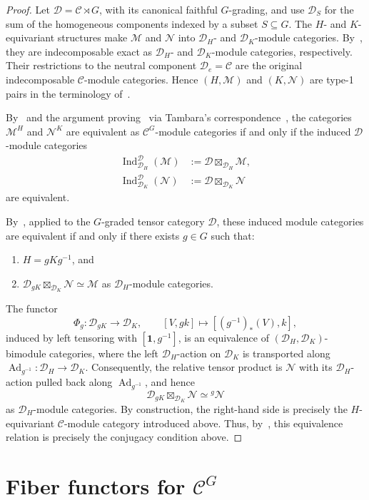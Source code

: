 \documentclass[12pt]{amsart}
\theoremstyle{plain}
\theoremstyle{definition} %
\theoremstyle{remark} %
\newcommand{\cC}{\mathcal{C}}
\newcommand{\cD}{\mathcal{D}}
\newcommand{\cM}{\mathcal{M}}
\newcommand{\cN}{\mathcal{N}}
\DeclareMathOperator{\Ind}{Ind}
\newcommand{\Ad}{\operatorname{Ad}}
\begin{document}
\begin{proof}
Let $\cD=\cC\rtimes G$, with its canonical faithful $G$-grading, and use $\cD_S$ for the sum of the homogeneous components indexed by a subset $S\subseteq G$. The $H$- and $K$-equivariant structures make $\cM$ and $\cN$ into $\cD_H$- and $\cD_K$-module categories. By~\cite[Proposition 3.4(1)]{GM11}, they are indecomposable exact as $\cD_H$- and $\cD_K$-module categories, respectively. Their restrictions to the neutral component $\cD_e=\cC$ are the original indecomposable $\cC$-module categories. Hence $(H,\cM)$ and $(K,\cN)$ are type-1 pairs in the terminology of~\cite[Subsection~5.1]{MM20}.

By~\cite[Proposition 3.4(3)]{GM11} and the argument proving~\cite[Proposition 3.4(5)]{GM11} via Tambara's correspondence~\cite[Theorem 4.1]{T01}, the categories $\cM^H$ and $\cN^K$ are equivalent as $\cC^G$-module categories if and only if the induced $\cD$-module categories
\begin{align*}
\Ind_{\cD_H}^{\cD}(\cM) &:=
\cD\boxtimes_{\cD_H}\cM, \\
\Ind_{\cD_K}^{\cD}(\cN) &:=
\cD\boxtimes_{\cD_K}\cN
\end{align*}
are equivalent.

By~\cite[Definition~5.10 and Proposition~5.12]{MM20}, applied to the $G$-graded tensor category $\cD$, these induced module categories are equivalent if and only if there exists $g\in G$ such that:
\begin{enumerate}
\item $H = gKg^{-1}$, and
\item $\cD_{gK}\boxtimes_{\cD_K}\cN \simeq \cM$ as $\cD_H$-module categories.
\end{enumerate}
The functor
\[
\Phi_g:\cD_{gK}\longrightarrow\cD_K,
\qquad
[V,gk]\longmapsto[(g^{-1})_*(V),k],
\]
induced by left tensoring with $[\mathbf{1},g^{-1}]$, is an equivalence of $(\cD_H,\cD_K)$-bimodule categories, where the left $\cD_H$-action on $\cD_K$ is transported along $\Ad_{g^{-1}}:\cD_H\to\cD_K$. Consequently, the relative tensor product is $\cN$ with its $\cD_H$-action pulled back along $\Ad_{g^{-1}}$, and hence
\[
\cD_{gK}\boxtimes_{\cD_K}\cN\simeq{}^g\cN
\]
as $\cD_H$-module categories. By construction, the right-hand side is precisely the $H$-equivariant $\cC$-module category introduced above.
Thus, by~\cite[Def.~5.10, Prop.~5.12]{MM20}, this equivalence relation is precisely the conjugacy condition above.
\end{proof}

\section{Fiber functors for \texorpdfstring{$\cC^G$}{CG}}\label{sec:fiber-functors}
\end{document}
